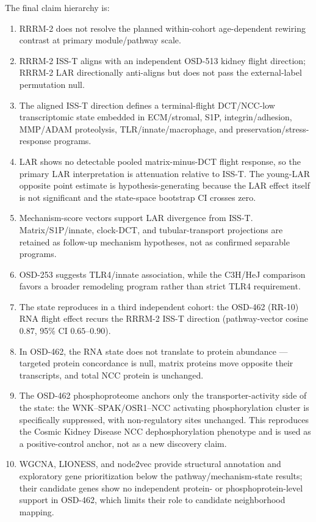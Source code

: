 \documentclass[11pt]{article}
\begin{document}
The final claim hierarchy is:
\begin{enumerate}
  \item RRRM-2 does not resolve the planned within-cohort age-dependent rewiring contrast at primary module/pathway scale.
  \item RRRM-2 ISS-T aligns with an independent OSD-513 kidney flight direction; RRRM-2 LAR directionally anti-aligns but does not pass the external-label permutation null.
  \item The aligned ISS-T direction defines a terminal-flight DCT/NCC-low transcriptomic state embedded in ECM/stromal, S1P, integrin/adhesion, MMP/ADAM proteolysis, TLR/innate/macrophage, and preservation/stress-response programs.
  \item LAR shows no detectable pooled matrix-minus-DCT flight response, so the primary LAR interpretation is attenuation relative to ISS-T. The young-LAR opposite point estimate is hypothesis-generating because the LAR effect itself is not significant and the state-space bootstrap CI crosses zero.
  \item Mechanism-score vectors support LAR divergence from ISS-T. Matrix/S1P/innate, clock-DCT, and tubular-transport projections are retained as follow-up mechanism hypotheses, not as confirmed separable programs.
  \item OSD-253 suggests TLR4/innate association, while the C3H/HeJ comparison favors a broader remodeling program rather than strict TLR4 requirement.
  \item The state reproduces in a third independent cohort: the OSD-462 (RR-10) RNA flight effect recurs the RRRM-2 ISS-T direction (pathway-vector cosine $0.87$, 95\% CI $0.65$--$0.90$).
  \item In OSD-462, the RNA state does not translate to protein abundance --- targeted protein concordance is null, matrix proteins move opposite their transcripts, and total NCC protein is unchanged.
  \item The OSD-462 phosphoproteome anchors only the transporter-activity side of the state: the WNK--SPAK/OSR1--NCC activating phosphorylation cluster is specifically suppressed, with non-regulatory sites unchanged. This reproduces the Cosmic Kidney Disease NCC dephosphorylation phenotype \citep{siew2024cosmic} and is used as a positive-control anchor, not as a new discovery claim.
  \item WGCNA, LIONESS, and node2vec provide structural annotation and exploratory gene prioritization below the pathway/mechanism-state results; their candidate genes show no independent protein- or phosphoprotein-level support in OSD-462, which limits their role to candidate neighborhood mapping.
\end{enumerate}
\end{document}
